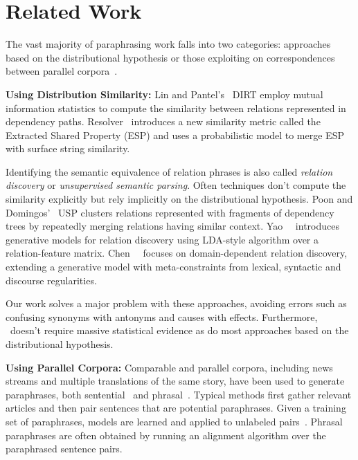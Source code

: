 
\section{Related Work}

The vast majority of paraphrasing work falls into two categories:
approaches based on the distributional hypothesis or those exploiting on
correspondences between parallel
corpora~\cite{androutsopoulos2009survey,madnani2010generating}.

{\bf Using Distribution Similarity:} Lin and
Pantel's~ DIRT employ mutual information
statistics to compute the similarity between relations represented in
dependency paths.  Resolver~\cite{yates2009unsupervised} introduces a
new similarity metric called the Extracted Shared Property (ESP) and
uses a probabilistic model to merge ESP with surface string
similarity.

Identifying the semantic equivalence of relation phrases is also 
called {\it relation discovery} or {\it unsupervised semantic
  parsing}.  Often techniques don't compute the similarity explicitly
but rely implicitly on the distributional hypothesis. Poon and
Domingos'~ USP clusters relations
represented with fragments of dependency trees by repeatedly merging
relations having similar
context. Yao~\etal~
introduces generative models for relation discovery using LDA-style
algorithm over a relation-feature matrix.
Chen~\etal~ focuses on domain-dependent
relation discovery, extending a generative model with meta-constraints
from lexical, syntactic and discourse regularities.

Our work solves a major problem with these approaches, avoiding errors
such as confusing synonyms with antonyms and causes with
effects. Furthermore, \sys\ doesn't require massive statistical
evidence as do most approaches based on the distributional hypothesis.



{\bf Using Parallel Corpora: } Comparable and parallel corpora,
including news streams and multiple translations of the same story,
have been used to generate paraphrases, both
sentential~\cite{barzilay2003learning,dolan2004unsupervised,shinyama2003paraphrase}
and
phrasal~\cite{barzilay2001extracting,shen2006adding,pang2003syntax}. Typical
methods first gather relevant articles and then pair sentences that
are potential paraphrases.  Given a training set of paraphrases,
models are learned and applied to unlabeled
pairs~\cite{dolan2005automatically,SocherEtAl2011:PoolRAE}. Phrasal
paraphrases are often obtained by running an alignment algorithm over
the paraphrased sentence pairs.

